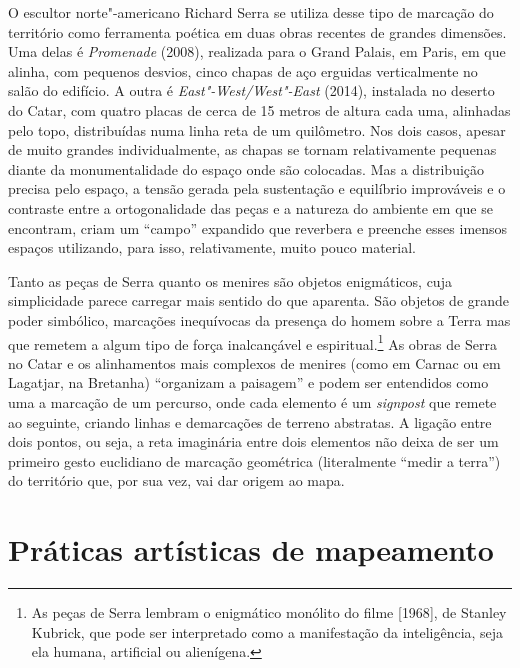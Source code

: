 O escultor norte"-americano Richard Serra se utiliza desse tipo de marcação do território
como ferramenta poética em duas obras recentes de grandes dimensões. Uma
delas é \emph{Promenade} (2008), realizada para o Grand Palais, em
Paris, em que alinha, com pequenos desvios, cinco chapas de aço erguidas
verticalmente no salão do edifício. A outra é \emph{East"-West/West"-East}
(2014), instalada no deserto do Catar, com quatro placas de cerca de 15
metros de altura cada uma, alinhadas pelo topo, distribuídas numa linha
reta de um quilômetro. Nos dois casos, apesar de muito grandes
individualmente, as chapas se tornam relativamente pequenas diante da
monumentalidade do espaço onde são colocadas. Mas a distribuição precisa
pelo espaço, a tensão gerada pela sustentação e equilíbrio improváveis e
o contraste entre a ortogonalidade das peças e a natureza do ambiente em
que se encontram, criam um ``campo'' expandido que reverbera e preenche
esses imensos espaços utilizando, para isso, relativamente, muito pouco
material.

Tanto as peças de Serra quanto os menires são objetos enigmáticos, cuja
simplicidade parece carregar mais sentido do que aparenta. São objetos
de grande poder simbólico, marcações inequívocas da presença do homem
sobre a Terra mas que remetem a algum tipo de força inalcançável e
espiritual.\footnote{As peças de Serra lembram o enigmático monólito do
  filme {} {[}1968{]}, de Stanley
  Kubrick, que pode ser interpretado como a manifestação da
  inteligência, seja ela humana, artificial ou alienígena.} As obras de
Serra no Catar e os alinhamentos mais complexos de menires (como em
Carnac ou em Lagatjar, na Bretanha) ``organizam a paisagem'' e podem ser
entendidos como uma a marcação de um percurso, onde cada elemento é um
\emph{signpost} que remete ao seguinte, criando linhas e demarcações de
terreno abstratas. A ligação entre dois pontos, ou seja, a reta
imaginária entre dois elementos não deixa de ser um primeiro gesto
euclidiano de marcação geométrica (literalmente ``medir a terra'') do
território que, por sua vez, vai dar origem ao mapa.


\part{Práticas artísticas de mapeamento}

